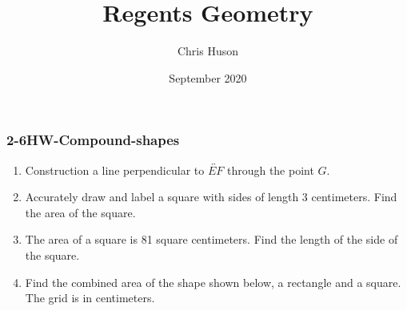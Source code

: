 \documentclass[12pt, twoside]{article}
\title{Regents Geometry}
\author{Chris Huson}
\date{September 2020}
\begin{document}
\subsubsection*{2-6HW-Compound-shapes}
\begin{enumerate}
\item Construction a line perpendicular to $\overleftrightarrow{EF}$ through the point $G$. \vspace{5cm}
      \begin{center}
      \end{center} \vspace{4cm}

\item Accurately draw and label a square with sides of length 3 centimeters. Find the area of the square. \vspace{6cm}
      
\item The area of a square is 81 square centimeters. Find the length of the side of the square.

    \newpage

\item Find the combined area of the shape shown below, a rectangle and a square. The grid is in centimeters.
    \begin{flushleft}
    \end{flushleft} \vspace{1cm} 


\end{enumerate}
\end{document}
